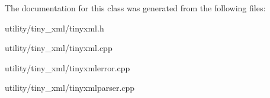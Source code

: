The documentation for this class was generated from the following files\+:\begin{DoxyCompactItemize}
\item 
utility/tiny\+\_\+xml/tinyxml.\+h\item 
utility/tiny\+\_\+xml/tinyxml.\+cpp\item 
utility/tiny\+\_\+xml/tinyxmlerror.\+cpp\item 
utility/tiny\+\_\+xml/tinyxmlparser.\+cpp\end{DoxyCompactItemize}
